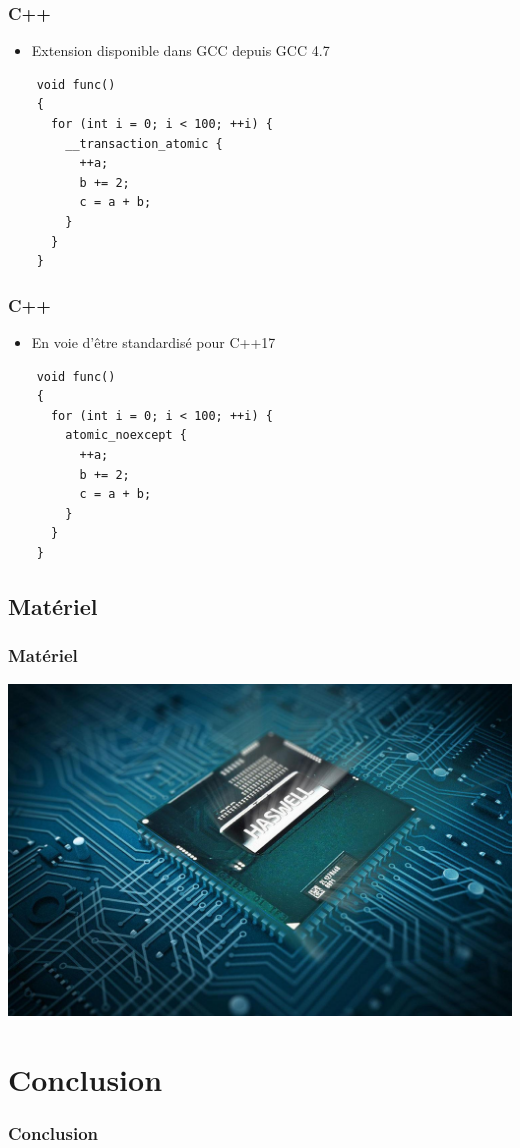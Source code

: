 \documentclass{beamer}
\begin{document}
\begin{frame}[fragile]
\frametitle{C++}
\begin{itemize}
\item Extension disponible dans GCC depuis GCC 4.7
\end{itemize}
\begin{lstlisting}
    void func()
    {
      for (int i = 0; i < 100; ++i) {
        __transaction_atomic {
          ++a;
          b += 2;
          c = a + b;
        }
      }
    }
\end{lstlisting}
\end{frame}

\begin{frame}[fragile]
\frametitle{C++}
\begin{itemize}
\item En voie d'être standardisé pour C++17
\end{itemize}
\begin{lstlisting}
    void func()
    {
      for (int i = 0; i < 100; ++i) {
        atomic_noexcept {
          ++a;
          b += 2;
          c = a + b;
        }
      }
    }
\end{lstlisting}
\end{frame}

\subsection{Matériel}
\begin{frame}
\frametitle{Matériel}
\begin{center}
\colorbox{white}{\includegraphics[scale=0.15]{haswell.jpg}}
\end{center}
\end{frame}

\section{Conclusion}
\begin{frame}
\frametitle{Conclusion}

\end{frame}
\end{document}
